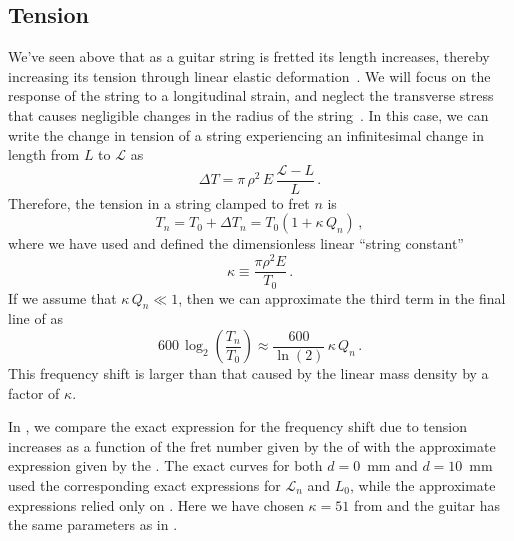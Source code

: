  \subsection{Tension\label{sct:model_tension}}
We've seen above that as a guitar string is fretted its length increases, thereby increasing its tension through linear elastic deformation~\cite{ref:landau1986toe}. We will focus on the response of the string to a longitudinal strain, and neglect the transverse stress that causes negligible changes in the radius of the string~\cite{ref:lynchaird2017mpn}. In this case, we can write the change in tension of a string experiencing an infinitesimal change in length from $L$ to $\mathcal{L}$ as
 \begin{equation} \label{eqn:youngs_mod_def}
\Delta T = \pi\, \rho^2\, E\, \frac{\mathcal{L} - L}{L}\, .
 \end{equation}
Therefore, the tension in a string clamped to fret $n$ is
 \begin{equation} \label{eqn:t_n_def}
T_n = T_0 + \Delta T_n = T_0 \left( 1 + \kappa\, Q_n \right)\, ,
 \end{equation}
where we have used  and defined the dimensionless linear ``string constant''
 \begin{equation}\label{eqn:kappa_def}
\kappa \equiv \frac{\pi \rho^2 E}{T_0}\, .
 \end{equation}
If we assume that $\kappa\, Q_n \ll 1$, then we can approximate the third term in the final line of  as
 \begin{equation} \label{eqn:tension_shift}
600\, \log_2 \left(  \frac{T_n}{T_0} \right) \approx \frac{600}{\ln(2)}\, \kappa\, Q_n\, .
 \end{equation}
This frequency shift is larger than that caused by the linear mass density by a factor of $\kappa$.

In , we compare the exact expression for the frequency shift due to tension increases as a function of the fret number given by the \lhs of  with the approximate expression given by the \rhs. The exact curves for both $d = 0$~mm and $d = 10$~mm used the corresponding exact expressions for $\mathcal{L}_n$ and $L_0$, while the approximate expressions relied only on . Here we have chosen $\kappa = 51$ from  and the guitar has the same parameters as in .

